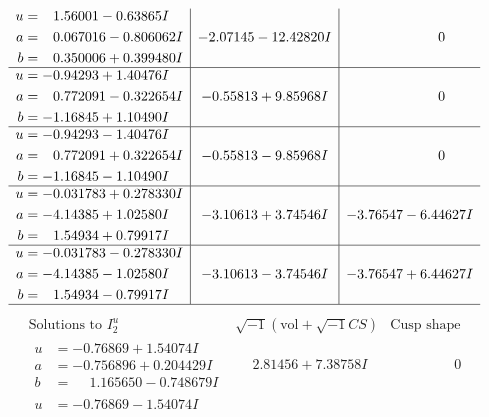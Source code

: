 \documentclass[1p]{elsarticle_modified}
\theoremstyle{definition}
\newcommand{\I}{\sqrt{-1}}
\begin{document}
$$\begin{array}{c|c|c}
\begin{aligned}
u &= \phantom{-}1.56001 - 0.63865 I \\
a &= \phantom{-}0.067016 - 0.806062 I \\
b &= \phantom{-}0.350006 + 0.399480 I\end{aligned}
 & -2.07145 - 12.42820 I & \phantom{-0.000000 } 0 \\ \hline\begin{aligned}
u &= -0.94293 + 1.40476 I \\
a &= \phantom{-}0.772091 - 0.322654 I \\
b &= -1.16845 + 1.10490 I\end{aligned}
 & -0.55813 + 9.85968 I & \phantom{-0.000000 } 0 \\ \hline\begin{aligned}
u &= -0.94293 - 1.40476 I \\
a &= \phantom{-}0.772091 + 0.322654 I \\
b &= -1.16845 - 1.10490 I\end{aligned}
 & -0.55813 - 9.85968 I & \phantom{-0.000000 } 0 \\ \hline\begin{aligned}
u &= -0.031783 + 0.278330 I \\
a &= -4.14385 + 1.02580 I \\
b &= \phantom{-}1.54934 + 0.79917 I\end{aligned}
 & -3.10613 + 3.74546 I & -3.76547 - 6.44627 I \\ \hline\begin{aligned}
u &= -0.031783 - 0.278330 I \\
a &= -4.14385 - 1.02580 I \\
b &= \phantom{-}1.54934 - 0.79917 I\end{aligned}
 & -3.10613 - 3.74546 I & -3.76547 + 6.44627 I\\
 \hline 
 \end{array}$$\newpage$$\begin{array}{c|c|c}  
\text{Solutions to }I^u_{2}& \I (\text{vol} + \sqrt{-1}CS) & \text{Cusp shape}\\
 \hline 
\begin{aligned}
u &= -0.76869 + 1.54074 I \\
a &= -0.756896 + 0.204429 I \\
b &= \phantom{-}1.165650 - 0.748679 I\end{aligned}
 & \phantom{-}2.81456 + 7.38758 I & \phantom{-0.000000 } 0 \\ \hline\begin{aligned}
u &= -0.76869 - 1.54074 I \\

\end{aligned}
\end{array}$$
\end{document}
